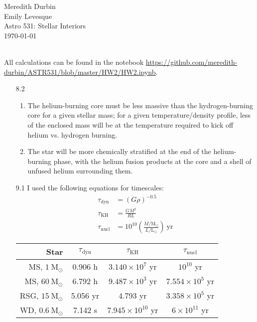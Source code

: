 \documentclass[11pt]{article}
\newcommand\lsol{\mathrm{L}_\odot}
\newcommand\msol{\mathrm{M}_\odot}
\begin{document}
\begin{flushright}Meredith Durbin\\
Emily Levesque\\
Astro 531: Stellar Interiors\\
\today\\

\end{flushright}

 \\[6pt]

All calculations can be found in the notebook \url{https://github.com/meredith-durbin/ASTR531/blob/master/HW2/HW2.ipynb}.

\begin{enumerate}

\item [8.2]
	\begin{enumerate}
	
    \item The helium-burning core must be less massive than the hydrogen-burning core for a given stellar mass; for a given temperature/density profile, less of the enclosed mass will be at the temperature required to kick off helium vs. hydrogen burning.
    
    \item The star will be more chemically stratified at the end of the helium-burning phase, with the helium fusion products at the core and a shell of unfused helium surrounding them.
    
    \end{enumerate}

\item [9.1] I used the following equations for timescales:
	\begin{align}
	\tau_\mathrm{dyn} &= \left(G \rho \right)^{-0.5} \\
	\tau_\mathrm{KH} &= \frac{GM^2}{RL} \\
	\tau_\mathrm{nucl} &= 10^{10} \left( \frac{M/\msol}{L/\lsol} \right) \mathrm{\ yr}
	\end{align}
    \begin{table}[H]
    \centering
    \begin{tabular}{ r | c | c | c }
      Star & $\tau_\mathrm{dyn}$ & $\tau_\mathrm{KH}$ & $\tau_\mathrm{nucl}$ \\ \hline
      MS, $1~\msol$ & 0.906 h & $3.140\times10^7$ yr & $10^{10}$ yr  \\
      MS, $60~\msol$ & 6.792 h & $9.487\times10^3$ yr & $7.554\times10^{5}$ yr  \\
      RSG, $15~\msol$ & 5.056 yr & 4.793 yr & $3.358\times10^{5}$ yr   \\
      WD, $0.6~\msol$ & 7.142 s & $7.945\times10^{10}$ yr & $6\times10^{11}$ yr  \\
    \end{tabular}
    \end{table}
    

\end{enumerate}
\end{document}
